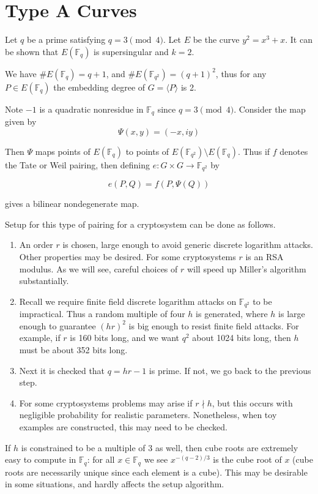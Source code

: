\section {Type A Curves}

Let $q$ be a prime satisfying $q = 3 \pmod{4}$.
Let $E$ be the curve $y^2 = x^3 + x$. It can be shown \cite{silverman86}
that $E(\mathbb{F}_q)$ is supersingular and $k = 2$.

We have $\#E(\mathbb{F}_q) = q+1$, and $\#E(\mathbb{F}_{q^2}) = (q+1)^2$,
thus for any $P\in E(\mathbb{F}_q)$
the embedding degree of $G = \langle P \rangle$ is 2.

Note $-1$ is a quadratic nonresidue in $\mathbb{F}_q$ since $q = 3\pmod{4}$.
Consider the map given by
\[ \Psi(x, y) = (-x, i y) \]

Then $\Psi$ maps points of $E(\mathbb{F}_q)$ to points of
$E(\mathbb{F}_{q^2}) \setminus E(\mathbb{F}_q)$. Thus if $f$ denotes the
Tate or Weil pairing, then defining $e:G \times G \rightarrow \mathbb{F}_{q^2}$
by

\[ e(P,Q) = f(P, \Psi(Q)) \]

gives a bilinear nondegenerate map.

Setup for this type of pairing for a cryptosystem can be done as follows.

\begin{enumerate}
\item
An order $r$ is chosen, large enough to avoid generic discrete logarithm
attacks. Other properties may be desired. For some cryptosystems $r$ is
an RSA modulus. As we will see, careful choices of $r$ will speed up Miller's
algorithm substantially.
\item
Recall we require finite field discrete logarithm attacks on $\mathbb{F}_{q^2}$
to be impractical. Thus a random multiple of four $h$ is generated,
where $h$ is large enough to guarantee $(hr)^2$ is big enough to resist
finite field attacks. For example, if $r$ is 160 bits long, and we want
$q^2$ about 1024 bits long, then $h$ must be about 352 bits long.
\item
Next it is checked that $q = h r - 1$ is prime.
If not, we go back to the previous step.
\item
For some cryptosystems problems may arise if $r \nmid h$, but this occurs
with negligible probability for realistic parameters. Nonetheless, when toy
examples are constructed, this may need to be checked.
\end{enumerate}

If $h$ is constrained to be a multiple of $3$ as well, then cube roots are
extremely easy to compute in $\mathbb{F}_{q}$:
for all $x \in \mathbb{F}_q$ we see $x^{-(q-2)/3}$ is the cube root of $x$
(cube roots are necessarily unique since each element is a cube).
This may be desirable in some situations, and hardly affects the setup
algorithm.

